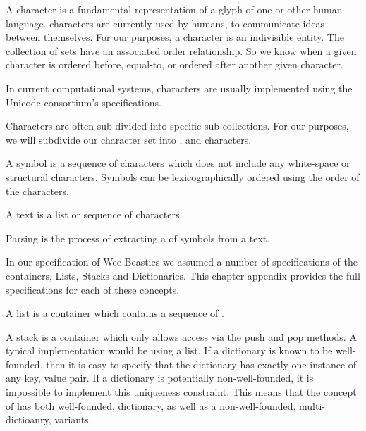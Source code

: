 \subChapterAppendix[title=Characters, reference=characterSpec]

A character is a fundamental representation of a glyph of one or other 
human language.  characters are currently used by humans, 
to communicate ideas between themselves. For our purposes, a character is 
an indivisible entity. The collection of sets have an associated order 
relationship. So we know when a given character is ordered before, 
equal-to, or ordered after another given character. 

In current computational systems, characters are usually implemented using 
the Unicode consortium's  specifications. 

Characters are often sub-divided into specific  
sub-collections. For our purposes, we will subdivide our character set 
into ,  and  
characters. 

\subChapterAppendix[title=Symbols, reference=symbolSpec]

A symbol is a sequence of characters which does not include any 
white-space or structural characters. Symbols can be lexicographically 
ordered using the order of the characters. 

\subChapterAppendix[title=Texts, reference=textSpec]

A text is a list or sequence of characters.

\subChapterAppendix[title=Parsing, reference=parsingSpec]

Parsing is the process of extracting a  of symbols from 
a text. 

\chapterAppendix[title=Containers]

In our specification of Wee Beasties we assumed a number of specifications 
of the containers, Lists, Stacks and Dictionaries. This chapter appendix 
provides the full specifications for each of these concepts. 

\subChapterAppendix[title=Lists, reference=listSpec]

A list is a container which contains a sequence of \lols.

\subChapterAppendix[title=Stacks, reference=stackSpec]

A stack is a container which only allows access via the push and pop 
methods. A typical implementation would be using a list. If a dictionary 
is known to be well-founded, then it is easy to specify that the 
dictionary has exactly one instance of any key, value pair. If a 
dictionary is potentially non-well-founded, it is impossible to implement 
this uniqueness constraint. This means that the concept of 
 has both well-founded, dictionary, as well as a 
non-well-founded, multi-dictioanry, variants. 

